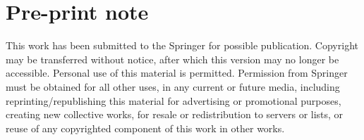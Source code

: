 \documentclass[twocolumn]{article}
\begin{document}
\section{Pre-print note}
This work has been submitted to the Springer for possible publication. Copyright may be transferred without notice, after which this version may no longer be accessible. Personal use of this material is permitted. Permission from Springer must be obtained for all other uses, in any current or future media, including reprinting/republishing this material for advertising or promotional purposes, creating new collective works, for resale or redistribution to servers or lists, or reuse of any copyrighted component of this work in other works.


\end{document}
